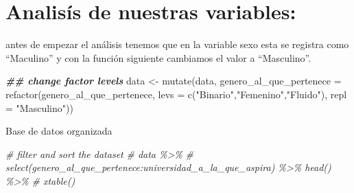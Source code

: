 \documentclass[
]{article}
\newenvironment{Shaded}{\begin{snugshade}}{\end{snugshade}}
\newcommand{\AttributeTok}[1]{\textcolor[rgb]{0.77,0.63,0.00}{#1}}
\newcommand{\CommentTok}[1]{\textcolor[rgb]{0.56,0.35,0.01}{\textit{#1}}}
\newcommand{\DocumentationTok}[1]{\textcolor[rgb]{0.56,0.35,0.01}{\textbf{\textit{#1}}}}
\newcommand{\FunctionTok}[1]{\textcolor[rgb]{0.00,0.00,0.00}{#1}}
\newcommand{\NormalTok}[1]{#1}
\newcommand{\OtherTok}[1]{\textcolor[rgb]{0.56,0.35,0.01}{#1}}
\newcommand{\StringTok}[1]{\textcolor[rgb]{0.31,0.60,0.02}{#1}}
\begin{document}
\hypertarget{analisuxeds-de-nuestras-variables}{%
\section{Analisís de nuestras
variables:}\label{analisuxeds-de-nuestras-variables}}

antes de empezar el análisis tenemos que en la variable sexo esta se
registra como ``Maculino'' y con la función siguiente cambiamos el valor
a ``Masculino''.

\begin{Shaded}
\begin{Highlighting}[]
\DocumentationTok{\#\# change factor levels}
\NormalTok{data }\OtherTok{\textless{}{-}} \FunctionTok{mutate}\NormalTok{(data,}
               \AttributeTok{genero\_al\_que\_pertenece =}
                 \FunctionTok{refactor}\NormalTok{(genero\_al\_que\_pertenece,}
                          \AttributeTok{levs =} \FunctionTok{c}\NormalTok{(}\StringTok{"Binario"}\NormalTok{,}\StringTok{"Femenino"}\NormalTok{,}\StringTok{"Fluido"}\NormalTok{),}
                          \AttributeTok{repl =} \StringTok{"Masculino"}\NormalTok{))}
\end{Highlighting}
\end{Shaded}

Base de datos organizada

\begin{Shaded}
\begin{Highlighting}[]
\CommentTok{\# filter and sort the dataset}
\CommentTok{\# data \%\textgreater{}\%}
\CommentTok{\#   select(genero\_al\_que\_pertenece:universidad\_a\_la\_que\_aspira) \%\textgreater{}\% head() \%\textgreater{}\%}
\CommentTok{\#   xtable()}
\end{Highlighting}
\end{Shaded}
\end{document}
